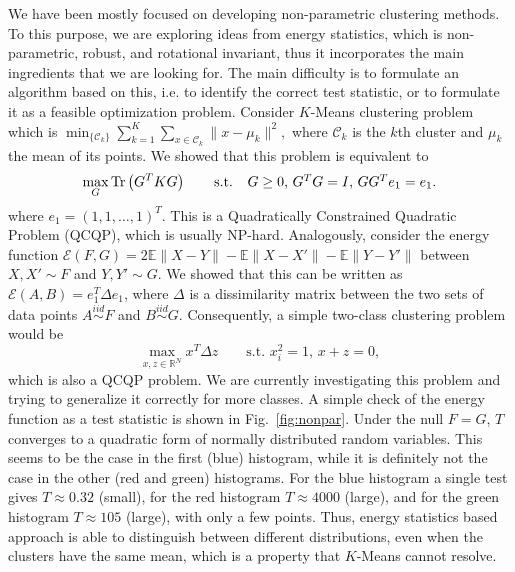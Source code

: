 \documentclass[simplex.tex]{subfiles}
\begin{document}
We have been mostly focused on developing 
non-parametric clustering methods.
To this purpose, we are exploring ideas from energy statistics,
which is non-parametric,
robust, and rotational invariant, thus it incorporates the main ingredients
that we are looking for. The main difficulty is to formulate an 
algorithm based on this, i.e. to identify the correct test 
statistic, or to formulate it as a feasible optimization problem.
Consider $K$-Means clustering problem which is 
$
\min_{\{\mathcal{C}_k\}} 
\sum_{k=1}^K \sum_{x \in \mathcal{C}_k} \| x - \mu_k  \|^2,
$
where $\mathcal{C}_k$ is the $k$th cluster and $\mu_k$ the mean of its points.
We showed that this problem is equivalent to
\begin{equation}
\max_{G} \textnormal{Tr}\left( G^T K G \right) \qquad 
\mbox{s.t. \, $G \ge 0$, $G^T G=I$, $G G^T e_1 = e_1$}.
\end{equation}
where $e_1 = (1,1,\dotsc,1)^T$.
This is a Quadratically Constrained Quadratic Problem (QCQP), which is usually 
NP-hard.
Analogously, consider the energy function 
$\mathcal{E}(F,G) = 2\mathbb{E} \| X - Y\| - \mathbb{E}\| X - X'\| - \mathbb{E}
\| Y - Y'\|$ between $X,X' \sim F$ and $Y,Y' \sim G$. We showed that this can
be written as $\mathcal{E}(A,B) = e_1^T \Delta e_1 $, where $\Delta$ is a
dissimilarity 
matrix between the two sets of data points 
$A \stackrel{iid}{\sim} F$ 
and $B \stackrel{iid}{\sim} G$.
Consequently, a simple two-class clustering problem would be
\begin{equation}
\max_{x,z\in \mathbb{R}^N} x^T \Delta z \qquad 
\mbox{s.t. $x_i^2=1$, $x+z = 0$},
\end{equation}
which is also a QCQP problem. We are currently investigating this problem and
trying to generalize it correctly for more classes.
A simple check of the energy function as a test statistic 
is shown in Fig.~\ref{fig:nonpar}. 
Under the null $F = G$, 
$T$ converges to a quadratic form of normally distributed random variables. This
seems to be the case in the first (blue) histogram, while it is definitely not
the case in the other (red and green) histograms. 
For the blue histogram a single test gives
$T \approx 0.32$ (small), for the red
histogram $T \approx 4000 $ (large), and for the green 
histogram $T \approx 105$ (large), with
only a few points. Thus, energy statistics based approach is 
able to distinguish between
different distributions, even when the clusters have the same mean, which is a
property that $K$-Means cannot resolve.
\end{document}
